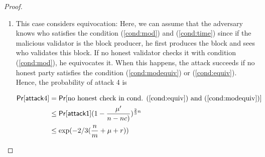 \begin{proof}
\begin{enumerate}
    \item This case considers equivocation: Here, we can assume that the adversary knows who satisfies the condition (\ref{cond:mod}) and (\ref{cond:time}) since if the malicious validator is the block producer, he first produces the block and sees who validates this block. If no honest validator checks it with condition (\ref{cond:mod}), he equivocates it. When this happens, the attack succeeds if no honest party satisfies the condition (\ref{cond:modequiv}) or (\ref{cond:equiv}). Hence,
    the probability of attack 4 is
    
    \begin{align}
    \mathsf{Pr}[\mathsf{attack} 4] &=\mathsf{Pr}[\text{no honest check in  cond. (\ref{cond:equiv}) and (\ref{cond:modequiv})}]\nonumber \\ 
							&\leq \mathsf{Pr}[\mathsf{attack1}](1-\frac{\mu'}{n-nc)}) ^{\frac{2}{3}n} \nonumber\\
				            & \leq \exp({-2/3(\frac{n}{m}+\mu + r)}) \nonumber
    \end{align}
\end{enumerate}	
    
    
    





%




\end{proof}
